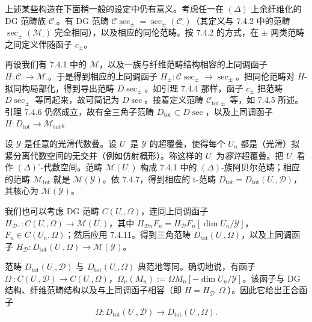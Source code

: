  上述某些构造在下面稍一般的设定中仍有意义。考虑任一在 $(\Delta)$ 上余纤维化的 DG 范畴族 $\mathcal{C}_{\cdot}$。有 DG 范畴 $\mathcal{C}\sec_{\pm}=\sec_{\pm}(\mathcal{C}_{\cdot})$（其定义与 7.4.2 中的范畴 $\sec_{\pm}(\mathcal{M}_{\cdot})$ 完全相同），以及相应的同伦范畴。按 7.4.2 的方式，在 $\pm$ 两类范畴之间定义伴随函子 $c_{\pm}$。

再设我们有 7.4.1 中的 $\mathcal{M}$，以及一族与纤维范畴结构相容的上同调函子 $H:\mathcal{C}_{\cdot}\to\mathcal{M}_{\cdot}$。于是得到相应的上同调函子 $H_{\pm}:\mathcal{C}\sec_{\pm}\to\sec_{\pm}$。把同伦范畴对 $H$-拟同构局部化，得到导出范畴 $D\sec_{\pm}$。如引理 7.4.4 那样，函子 $c_{\pm}$ 把范畴 $D\sec_{\pm}$ 等同起来，故可简记为 $D\sec$。接着定义范畴 $\mathcal{C}_{\mathrm{tot}\pm}$ 等，如 7.4.5 所述。引理 7.4.6 仍然成立，故有全三角子范畴 $D_{\mathrm{tot}}\subset D\sec$，以及上同调函子 $H:D_{\mathrm{tot}}\to\mathcal{M}_{\mathrm{tot}}$。


 设 $\mathcal{Y}$ 是任意的光滑代数叠。设 $U_{\cdot}$ 是 $\mathcal{Y}$ 的超覆叠，使得每个 $U_{n}$ 都是（光滑）拟紧分离代数空间的无交并（例如仿射概形）。称这样的 $U_{\cdot}$ 为\emph{容许}超覆叠。把 $U_{\cdot}$ 看作 $(\Delta)^{\circ}$-代数空间。范畴 $\mathcal{M}(U_{\cdot})$ 构成 7.4.1 中的 $(\Delta)$-族阿贝尔范畴；相应的范畴 $\mathcal{M}_{\mathrm{tot}}$ 就是 $\mathcal{M}(\mathcal{Y})$。依 7.4.7，得到相应的 t-范畴 $D_{\mathrm{tot}}=D_{\mathrm{tot}}(U_{\cdot},\mathcal{D})$，其核心为 $\mathcal{M}(\mathcal{Y})$。

我们也可以考虑 DG 范畴 $C(U_{\cdot},\Omega)$，连同上同调函子 $H_{\mathcal{D}\cdot}:C(U_{\cdot},\Omega)\to\mathcal{M}(U_{\cdot})$，其中 $H_{\mathcal{D}n}F_{n}=H_{\mathcal{D}}F_{n}[\dim U_{n}/\mathcal{Y}]$，$F_{n}\in C(U_{n},\Omega)$；然后应用 7.4.11。得到三角范畴 $D_{\mathrm{tot}}(U_{\cdot},\Omega)$，以及上同调函子 $H_{\mathcal{D}}:D_{\mathrm{tot}}(U_{\cdot},\Omega)\to\mathcal{M}(\mathcal{Y})$。

范畴 $D_{\mathrm{tot}}(U_{\cdot},\mathcal{D})$ 与 $D_{\mathrm{tot}}(U_{\cdot},\Omega)$ 典范地等同。确切地说，有函子 $\Omega_{\cdot}:C(U_{\cdot},\mathcal{D})\to C(U_{\cdot},\Omega)$，$\Omega_{n}(M_{n}):=\Omega M_{n}[-\dim U_{n}/\mathcal{Y}]$。该函子与 DG 结构、纤维范畴结构以及与上同调函子相容（即 $H=H_{\mathcal{D}\cdot}\Omega_{\cdot}$）。因此它给出正合函子
\begin{equation}\tag{315}
\Omega:D_{\mathrm{tot}}(U_{\cdot},\mathcal{D})\to D_{\mathrm{tot}}(U_{\cdot},\Omega).
\end{equation}

